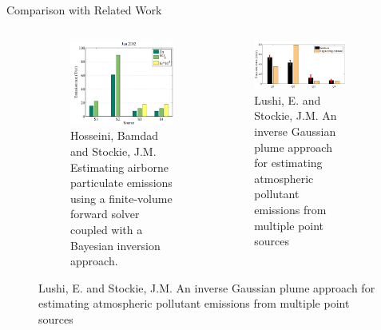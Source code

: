 \documentclass[11pt]{beamer}
\theoremstyle{plain}
\theoremstyle{definition}
\begin{document}
\begin{frame}{Comparison with Related Work}
\begin{figure}
\begin{columns}[c]
\begin{figure}
\includegraphics[scale=0.25]{Stockie_Lushi}
\caption{Hosseini, Bamdad and Stockie, J.M. Estimating airborne particulate emissions using a finite-volume
forward solver coupled with a Bayesian inversion approach.}
\end{figure}
\begin{figure}
\includegraphics[scale=0.28]{Hosseini}
\caption{Lushi, E. and Stockie, J.M. An inverse Gaussian plume approach for estimating atmospheric
pollutant emissions from multiple point sources}
\end{figure}
\end{columns}
\end{figure}
\end{frame}
\end{document}
